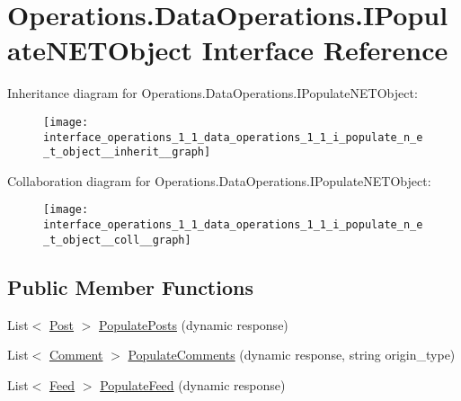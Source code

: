 \hypertarget{interface_operations_1_1_data_operations_1_1_i_populate_n_e_t_object}{}\section{Operations.\+Data\+Operations.\+I\+Populate\+N\+E\+T\+Object Interface Reference}
\label{interface_operations_1_1_data_operations_1_1_i_populate_n_e_t_object}


Inheritance diagram for Operations.\+Data\+Operations.\+I\+Populate\+N\+E\+T\+Object\+:
\nopagebreak
\begin{figure}[H]
\begin{center}
\leavevmode
\texttt{[image: interface\_operations\_1\_1\_data\_operations\_1\_1\_i\_populate\_n\_e\_t\_object\_\_inherit\_\_graph]}
\end{center}
\end{figure}


Collaboration diagram for Operations.\+Data\+Operations.\+I\+Populate\+N\+E\+T\+Object\+:
\nopagebreak
\begin{figure}[H]
\begin{center}
\leavevmode
\texttt{[image: interface\_operations\_1\_1\_data\_operations\_1\_1\_i\_populate\_n\_e\_t\_object\_\_coll\_\_graph]}
\end{center}
\end{figure}
\subsection*{Public Member Functions}
\begin{DoxyCompactItemize}
\item 
List$<$ \hyperlink{class_data_1_1_facebook_objects_1_1_post}{Post} $>$ \hyperlink{interface_operations_1_1_data_operations_1_1_i_populate_n_e_t_object_a404db639d5476203f9aabfe79d10c6ab}{Populate\+Posts} (dynamic response)
\item 
List$<$ \hyperlink{class_data_1_1_facebook_objects_1_1_comment}{Comment} $>$ \hyperlink{interface_operations_1_1_data_operations_1_1_i_populate_n_e_t_object_ac71d6a76fa87075a7bee781e0e82aa3e}{Populate\+Comments} (dynamic response, string origin\+\_\+type)
\item 
List$<$ \hyperlink{class_data_1_1_facebook_objects_1_1_feed}{Feed} $>$ \hyperlink{interface_operations_1_1_data_operations_1_1_i_populate_n_e_t_object_a09f34c1fdef92c7c02f6ae8b47caef89}{Populate\+Feed} (dynamic response)
\end{DoxyCompactItemize}


